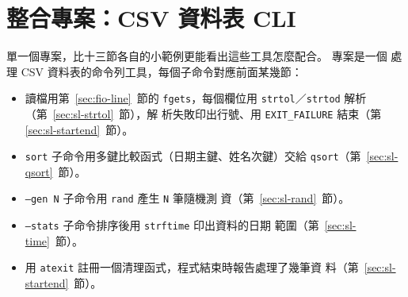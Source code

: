 {}
\section*{整合專案：CSV 資料表 CLI}
\label{sec:sl-capstone}

單一個專案，比十三節各自的小範例更能看出這些工具怎麼配合。 專案是一個
處理 CSV 資料表的命令列工具，每個子命令對應前面某幾節：

\begin{itemize}
\item 讀檔用第~\ref{sec:fio-line}~節的 \texttt{fgets}，每個欄位用
\texttt{strtol}／\texttt{strtod} 解析（第~\ref{sec:sl-strtol}~節），解
析失敗印出行號、用 \texttt{EXIT\_FAILURE} 結束（第
\ref{sec:sl-startend}~節）。
\item \texttt{sort} 子命令用多鍵比較函式（日期主鍵、姓名次鍵）交給
\texttt{qsort}（第~\ref{sec:sl-qsort}~節）。
\item \texttt{--gen N} 子命令用 \texttt{rand} 產生 \texttt{N} 筆隨機測
資（第~\ref{sec:sl-rand}~節）。
\item \texttt{--stats} 子命令排序後用 \texttt{strftime} 印出資料的日期
範圍（第~\ref{sec:sl-time}~節）。
\item 用 \texttt{atexit} 註冊一個清理函式，程式結束時報告處理了幾筆資
料（第~\ref{sec:sl-startend}~節）。
\end{itemize}


